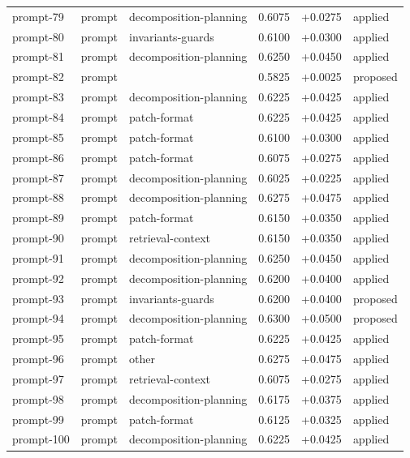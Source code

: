 \begin{center}
\begin{longtable}{llp{5.2cm}rrl}
prompt-79 & prompt & decomposition-planning & 0.6075 & +0.0275 & applied \\
prompt-80 & prompt & invariants-guards & 0.6100 & +0.0300 & applied \\
prompt-81 & prompt & decomposition-planning & 0.6250 & +0.0450 & applied \\
prompt-82 & prompt &  & 0.5825 & +0.0025 & proposed \\
prompt-83 & prompt & decomposition-planning & 0.6225 & +0.0425 & applied \\
prompt-84 & prompt & patch-format & 0.6225 & +0.0425 & applied \\
prompt-85 & prompt & patch-format & 0.6100 & +0.0300 & applied \\
prompt-86 & prompt & patch-format & 0.6075 & +0.0275 & applied \\
prompt-87 & prompt & decomposition-planning & 0.6025 & +0.0225 & applied \\
prompt-88 & prompt & decomposition-planning & 0.6275 & +0.0475 & applied \\
prompt-89 & prompt & patch-format & 0.6150 & +0.0350 & applied \\
prompt-90 & prompt & retrieval-context & 0.6150 & +0.0350 & applied \\
prompt-91 & prompt & decomposition-planning & 0.6250 & +0.0450 & applied \\
prompt-92 & prompt & decomposition-planning & 0.6200 & +0.0400 & applied \\
prompt-93 & prompt & invariants-guards & 0.6200 & +0.0400 & proposed \\
prompt-94 & prompt & decomposition-planning & 0.6300 & +0.0500 & proposed \\
prompt-95 & prompt & patch-format & 0.6225 & +0.0425 & applied \\
prompt-96 & prompt & other & 0.6275 & +0.0475 & applied \\
prompt-97 & prompt & retrieval-context & 0.6075 & +0.0275 & applied \\
prompt-98 & prompt & decomposition-planning & 0.6175 & +0.0375 & applied \\
prompt-99 & prompt & patch-format & 0.6125 & +0.0325 & applied \\
prompt-100 & prompt & decomposition-planning & 0.6225 & +0.0425 & applied \\
\bottomrule\end{longtable}\end{center}
\clearpage
